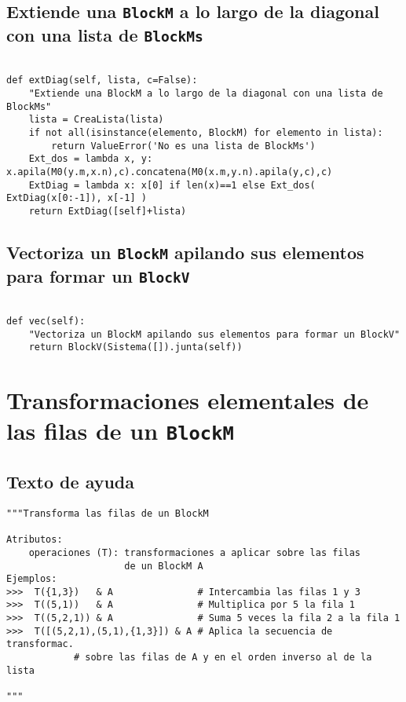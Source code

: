 \documentclass[11pt]{report}
\begin{document}
\subsection{Extiende una \texttt{BlockM} a lo largo de la diagonal con una lista de \texttt{BlockMs}}
\label{sec:orga15aaf2}

\begin{verbatim}
   
def extDiag(self, lista, c=False):
    "Extiende una BlockM a lo largo de la diagonal con una lista de BlockMs"
    lista = CreaLista(lista)
    if not all(isinstance(elemento, BlockM) for elemento in lista): 
        return ValueError('No es una lista de BlockMs')
    Ext_dos = lambda x, y: x.apila(M0(y.m,x.n),c).concatena(M0(x.m,y.n).apila(y,c),c)
    ExtDiag = lambda x: x[0] if len(x)==1 else Ext_dos( ExtDiag(x[0:-1]), x[-1] )
    return ExtDiag([self]+lista)

\end{verbatim}

\subsection{Vectoriza un \texttt{BlockM} apilando sus elementos para formar un \texttt{BlockV}}
\label{sec:org67f7698}
\begin{verbatim}
   
def vec(self):
    "Vectoriza un BlockM apilando sus elementos para formar un BlockV"
    return BlockV(Sistema([]).junta(self))

\end{verbatim}

\section{Transformaciones elementales de las filas de un \texttt{BlockM}}
\label{sec:org4af8236}

\subsection{Texto de ayuda}
\label{sec:org5176f27}

\begin{verbatim}
"""Transforma las filas de un BlockM

Atributos:
    operaciones (T): transformaciones a aplicar sobre las filas
                     de un BlockM A
Ejemplos:
>>>  T({1,3})   & A               # Intercambia las filas 1 y 3
>>>  T((5,1))   & A               # Multiplica por 5 la fila 1
>>>  T((5,2,1)) & A               # Suma 5 veces la fila 2 a la fila 1
>>>  T([(5,2,1),(5,1),{1,3}]) & A # Aplica la secuencia de transformac.
            # sobre las filas de A y en el orden inverso al de la lista

"""
\end{verbatim}
\end{document}
